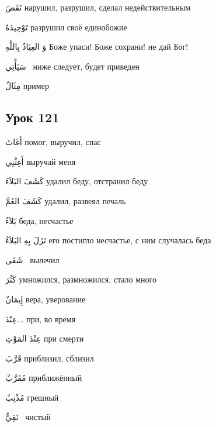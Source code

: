 \documentclass[a5paper]{article}
\newcommand\textstyleDropCaps[1]{#1}
\newcommand\textstyleCaptioncharacters[1]{#1}
\begin{document}
\textstyleCaptioncharacters{نَقَضَ }\textstyleDropCaps{нарушил, разрушил, сделал недействительным‎}

\textstyleCaptioncharacters{تَوْحِيدَهُ }\textstyleDropCaps{разрушил своё единобожие‎}

\textstyleCaptioncharacters{وَ العِيَاذُ بِاللَّهِ }\textstyleDropCaps{Боже упа­си! Боже сохрани! не дай Бог!‎}

\textstyleCaptioncharacters{سَيَأْتِي \ }\textstyleDropCaps{ниже следует, бу­дет приведен‎}

\textstyleCaptioncharacters{مِثَالٌ }\textstyleDropCaps{пример‎}

\subsection[Урок 121‎]{\textstyleDropCaps{Урок 121‎}}
\textstyleCaptioncharacters{أَغَاثَ }\textstyleDropCaps{помог, выручил, спас‎}

\textstyleCaptioncharacters{أَغِثْنِي }\textstyleDropCaps{выручай меня‎}

\textstyleCaptioncharacters{كَشَفَ البَلاَءَ }\textstyleDropCaps{удалил беду, отстранил беду‎}

\textstyleCaptioncharacters{كَشَفَ الغَمَّ }\textstyleDropCaps{удалил, раз­веял печаль‎}

\textstyleCaptioncharacters{بَلاَءٌ }\textstyleDropCaps{беда, несчастье‎}

\textstyleCaptioncharacters{نَزَلَ بِهِ البَلاَءُ }\textstyleDropCaps{его постигло несчастье, с ним случалась беда‎}

\textstyleCaptioncharacters{شَفَى \ }\textstyleDropCaps{вылечил ‎}

\textstyleCaptioncharacters{كَثُرَ }\textstyleDropCaps{умножился, размно­жился, стало много‎}

\textstyleCaptioncharacters{إِيمَانٌ }\textstyleDropCaps{вера, уверование‎}

\textstyleCaptioncharacters{عِنْدَ... }\textstyleDropCaps{при, во время‎}

\textstyleCaptioncharacters{عِنْدَ المَوْتِ }\textstyleDropCaps{при смерти‎}

\textstyleCaptioncharacters{قَرَّبَ }\textstyleDropCaps{приблизил, сблизил‎}

\textstyleCaptioncharacters{مُقَرَّبٌ }\textstyleDropCaps{приближённый‎}

\textstyleCaptioncharacters{مُذْنِبٌ }\textstyleDropCaps{грешный‎}

\textstyleCaptioncharacters{نَقِيٌّ \ }\textstyleDropCaps{чистый‎}
\end{document}
